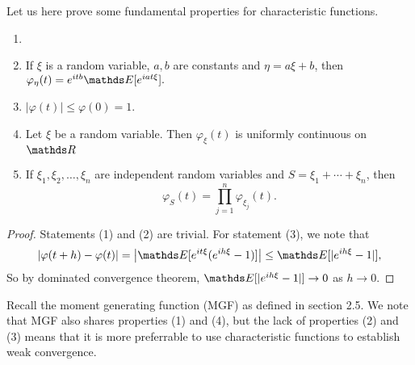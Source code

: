 Let us here prove some fundamental properties for characteristic functions.

\begin{property}
\begin{enumerate}
    \item[]
    \item If $\xi$ is a random variable, $a,b$ are constants and $\eta = a\xi + b$, then $\varphi_\eta (t) = e^{it b} \E[e^{iat\xi}].$
    \item $|\varphi(t)| \le \varphi(0) = 1$.
    \item Let $\xi$ be a random variable. Then $\varphi_\xi(t)$ is uniformly continuous on $\R$
    \item If $\xi_1, \xi_2, \dots, \xi_n$ are independent random variables and $S = \xi_1 + \cdots + \xi_n$, then
    \begin{equation*}
        \varphi_S(t) = \prod_{j=1}^n \varphi_{\xi_j}(t).
    \end{equation*}
\end{enumerate}
\end{property}
\begin{proof}
Statements (1) and (2) are trivial. For statement (3), we note that
\begin{equation*}
    |\varphi(t + h) - \varphi(t)| = \big| \E[e^{it\xi}(e^{ih\xi}-1)] \big| \le \E[|e^{ih\xi} - 1|],
\end{equation*}
So by dominated convergence theorem, $\E[|e^{ih\xi}-1|] \to 0$ as $h \to 0$.
\end{proof}

Recall the moment generating function (MGF) as defined in section 2.5. We note that MGF also shares properties (1) and (4), but the lack of properties (2) and (3) means that it is more preferrable to use characteristic functions to establish weak convergence.

